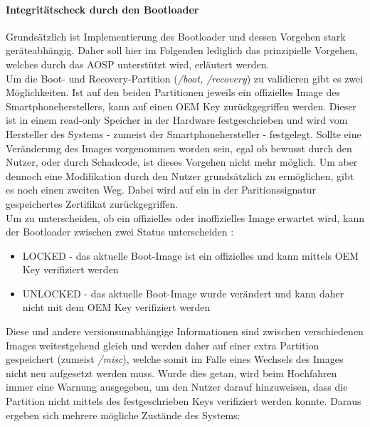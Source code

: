 	\paragraph{Integritätscheck durch den Bootloader}
	Grundsätzlich ist Implementierung des Bootloader und dessen Vorgehen stark
	geräteabhängig. Daher soll hier im Folgenden lediglich das prinzipielle
	Vorgehen, welches durch das AOSP unterstützt wird, erläutert werden.\\
	Um die Boot- und Recovery-Partition (\textit{/boot, /recovery}) zu validieren
	gibt es zwei Möglichkeiten. Ist auf den beiden Partitionen jeweils ein 
	offizielles Image des Smartphoneherstellers, kann auf einen OEM Key
	zurückgegriffen werden. Dieser ist in einem read-only Speicher in der Hardware
	festgeschrieben und wird vom Hersteller des Systems - zumeist der
	Smartphonehersteller - festgelegt. Sollte eine Veränderung des Images
	vorgenommen worden sein, egal ob bewusst durch den Nutzer, oder durch
	Schadcode, ist dieses Vorgehen nicht mehr möglich. Um aber dennoch eine
	Modifikation durch den Nutzer grundsätzlich zu ermöglichen, gibt es noch einen
	zweiten Weg. Dabei wird auf ein in der Paritionssignatur gespeichertes
	Zertifikat zurückgegriffen.\\
	Um zu unterscheiden, ob ein offizielles oder inoffizielles Image erwartet
	wird, kann der Bootloader zwischen zwei Status
	unterscheiden \cite{VerifiedBoot}:
	\begin{itemize}\itemsep0pt
		\item LOCKED - das aktuelle Boot-Image ist ein offizielles und kann mittels OEM Key verifiziert werden
		\item UNLOCKED - das aktuelle Boot-Image wurde verändert und kann daher nicht mit dem OEM Key verifiziert werden
	\end{itemize}
	Diese und andere versionsunabhängige Informationen sind zwischen
	verschiedenen Images weitestgehend gleich und werden daher auf einer extra
	Partition gespeichert (zumeist \textit{/misc}), welche somit im Falle eines
	Wechsels des Images nicht neu aufgesetzt werden muss.
	Wurde dies getan, wird beim Hochfahren immer eine Warnung ausgegeben, um den
	Nutzer darauf hinzuweisen, dass die Partition nicht mittels des
	festgeschrieben Keys verifiziert werden konnte. Daraus ergeben sich mehrere
	mögliche Zustände des Systems:
